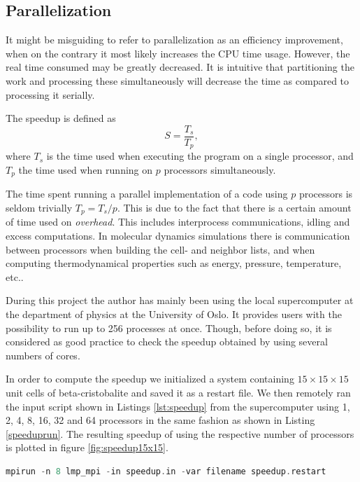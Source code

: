 \documentclass[twoside,english]{uiofysmaster}
\begin{document}
\subsection{Parallelization}
 It might be misguiding to refer to parallelization as an efficiency improvement, when on the contrary it most likely increases the CPU time usage. 
 However, the real time consumed may be greatly decreased. 
 It is intuitive that partitioning the work and processing these simultaneously will decrease the time as compared to processing it serially.   
 
 
 The speedup is defined as 
 \begin{equation}
 S = \frac{T_s}{T_p},
 \end{equation}
 where $T_s$ is the time used when executing the program on a single processor, and $T_p$ the time used when running on $p$ processors simultaneously.
 
 The time spent running a parallel implementation of a code using $p$ processors is seldom trivially $T_p=T_s/p$. This is due to the fact that there is a certain amount of time used on \textit{overhead}. This includes interprocess communications, idling and excess computations.
 In molecular dynamics simulations there is communication between processors when building the cell- and neighbor lists, and when computing thermodynamical properties such as energy, pressure, temperature, etc.. 

During this project the author has mainly been using the local supercomputer at the department of physics at the University of Oslo. It provides users with the possibility to run  up to 256 processes at once. Though, before doing so, it is considered as good practice to check the speedup obtained by using several numbers of cores.

In order to compute the speedup we initialized a system containing $15\times15\times15$ unit cells of beta-cristobalite and saved it as a restart file. 
We then remotely ran the input script shown in Listings \ref{lst:speedup} from the supercomputer using 1, 2, 4, 8, 16, 32 and 64 processors in the same fashion as shown in Listing \ref{speeduprun}.  
The resulting speedup of using the respective number of processors is plotted in figure \ref{fig:speedup15x15}.



\begin{lstlisting}[caption={Command used to excecute the input script speedup.in on 8 parallel processors and set the filename variable to speedup.restart.}, label={speeduprun}, language=c++]
mpirun -n 8 lmp_mpi -in speedup.in -var filename speedup.restart
\end{lstlisting}
\end{document}
